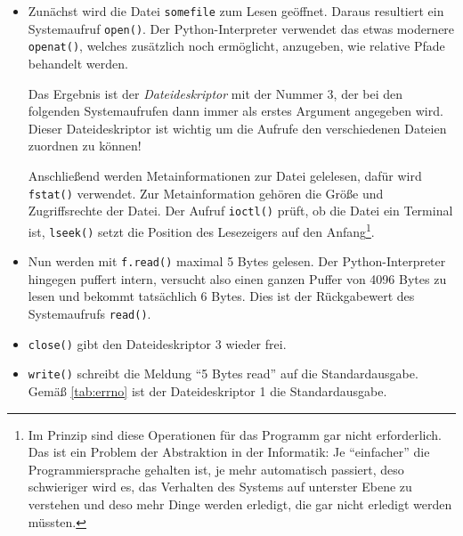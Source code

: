 \begin{itemize}
  \item Zunächst wird die Datei \texttt{somefile} zum Lesen geöffnet. Daraus resultiert
    ein Systemaufruf \texttt{open()}. Der Python-Interpreter verwendet das etwas modernere
    \texttt{openat()}, welches zusätzlich noch ermöglicht, anzugeben, wie relative Pfade
    behandelt werden.

    Das Ergebnis ist der \emph{Dateideskriptor} mit der Nummer 3, der bei den folgenden
    Systemaufrufen dann immer als erstes Argument angegeben wird. Dieser Dateideskriptor ist wichtig
    um die Aufrufe den verschiedenen Dateien zuordnen zu können!

    Anschließend werden Metainformationen zur Datei gelelesen, dafür wird \texttt{fstat()}
    verwendet. Zur Metainformation gehören die Größe und Zugriffsrechte der Datei. Der Aufruf
    \texttt{ioctl()} prüft, ob die Datei ein Terminal ist, \texttt{lseek()} setzt die Position
    des Lesezeigers auf den Anfang\footnote{Im Prinzip sind diese Operationen für das Programm
    gar nicht erforderlich. Das ist ein Problem der Abstraktion in der Informatik: Je "`einfacher"'
    die Programmiersprache gehalten ist, je mehr automatisch passiert, deso schwieriger wird es,
    das Verhalten des Systems auf unterster Ebene zu verstehen und deso mehr Dinge werden
    erledigt, die gar nicht erledigt werden müssten.}.

  \item Nun werden mit \texttt{f.read()} maximal 5 Bytes gelesen. Der Python-Interpreter hingegen
    puffert intern, versucht also einen ganzen Puffer von 4096 Bytes zu lesen und bekommt tatsächlich 6 Bytes. Dies ist der Rückgabewert des Systemaufrufs \texttt{read()}.

  \item \texttt{close()} gibt den Dateideskriptor 3 wieder frei.

  \item \texttt{write()} schreibt die Meldung "`5 Bytes read"' auf die Standardausgabe. Gemäß
    \autoref{tab:errno} ist der Dateideskriptor 1 die Standardausgabe.
\end{itemize}